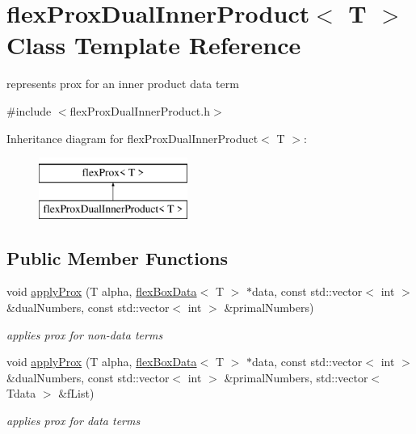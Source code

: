 \hypertarget{classflex_prox_dual_inner_product}{}\section{flex\+Prox\+Dual\+Inner\+Product$<$ T $>$ Class Template Reference}
\label{classflex_prox_dual_inner_product}


represents prox for an inner product data term  




{\ttfamily \#include $<$flex\+Prox\+Dual\+Inner\+Product.\+h$>$}

Inheritance diagram for flex\+Prox\+Dual\+Inner\+Product$<$ T $>$\+:\begin{figure}[H]
\begin{center}
\leavevmode
\includegraphics[height=2.000000cm]{classflex_prox_dual_inner_product}
\end{center}
\end{figure}
\subsection*{Public Member Functions}
\begin{DoxyCompactItemize}
\item 
void \hyperlink{classflex_prox_dual_inner_product_ac12298c520f5e8e81724e330e8dae6a3}{apply\+Prox} (T alpha, \hyperlink{classflex_box_data}{flex\+Box\+Data}$<$ T $>$ $\ast$data, const std\+::vector$<$ int $>$ \&dual\+Numbers, const std\+::vector$<$ int $>$ \&primal\+Numbers)
\begin{DoxyCompactList}\small\item\em applies prox for non-\/data terms \end{DoxyCompactList}\item 
void \hyperlink{classflex_prox_dual_inner_product_aa2444bfc4ad1c4ce77e9204bd9f85f69}{apply\+Prox} (T alpha, \hyperlink{classflex_box_data}{flex\+Box\+Data}$<$ T $>$ $\ast$data, const std\+::vector$<$ int $>$ \&dual\+Numbers, const std\+::vector$<$ int $>$ \&primal\+Numbers, std\+::vector$<$ Tdata $>$ \&f\+List)
\begin{DoxyCompactList}\small\item\em applies prox for data terms \end{DoxyCompactList}\end{DoxyCompactItemize}
